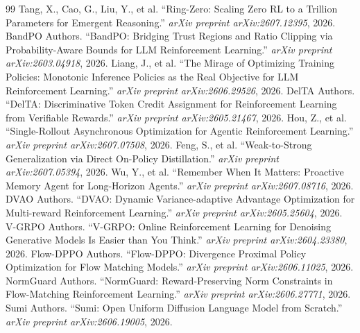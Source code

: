 \documentclass[11pt,a4paper]{article}
\begin{document}
\begin{thebibliography}{99}
 Tang, X., Cao, G., Liu, Y., et al. ``Ring-Zero: Scaling Zero RL to a Trillion Parameters for Emergent Reasoning.'' \emph{arXiv preprint arXiv:2607.12395}, 2026.
 BandPO Authors. ``BandPO: Bridging Trust Regions and Ratio Clipping via Probability-Aware Bounds for LLM Reinforcement Learning.'' \emph{arXiv preprint arXiv:2603.04918}, 2026.
 Liang, J., et al. ``The Mirage of Optimizing Training Policies: Monotonic Inference Policies as the Real Objective for LLM Reinforcement Learning.'' \emph{arXiv preprint arXiv:2606.29526}, 2026.
 DelTA Authors. ``DelTA: Discriminative Token Credit Assignment for Reinforcement Learning from Verifiable Rewards.'' \emph{arXiv preprint arXiv:2605.21467}, 2026.
 Hou, Z., et al. ``Single-Rollout Asynchronous Optimization for Agentic Reinforcement Learning.'' \emph{arXiv preprint arXiv:2607.07508}, 2026.
 Feng, S., et al. ``Weak-to-Strong Generalization via Direct On-Policy Distillation.'' \emph{arXiv preprint arXiv:2607.05394}, 2026.
 Wu, Y., et al. ``Remember When It Matters: Proactive Memory Agent for Long-Horizon Agents.'' \emph{arXiv preprint arXiv:2607.08716}, 2026.
 DVAO Authors. ``DVAO: Dynamic Variance-adaptive Advantage Optimization for Multi-reward Reinforcement Learning.'' \emph{arXiv preprint arXiv:2605.25604}, 2026.
 V-GRPO Authors. ``V-GRPO: Online Reinforcement Learning for Denoising Generative Models Is Easier than You Think.'' \emph{arXiv preprint arXiv:2604.23380}, 2026.
 Flow-DPPO Authors. ``Flow-DPPO: Divergence Proximal Policy Optimization for Flow Matching Models.'' \emph{arXiv preprint arXiv:2606.11025}, 2026.
 NormGuard Authors. ``NormGuard: Reward-Preserving Norm Constraints in Flow-Matching Reinforcement Learning.'' \emph{arXiv preprint arXiv:2606.27771}, 2026.
 Sumi Authors. ``Sumi: Open Uniform Diffusion Language Model from Scratch.'' \emph{arXiv preprint arXiv:2606.19005}, 2026.
\end{thebibliography}
\end{document}
